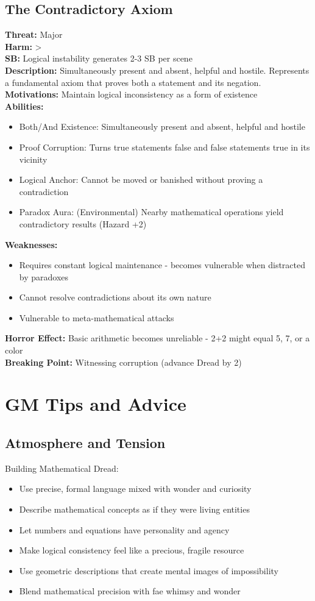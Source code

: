 \documentclass[11pt]{article}
\newenvironment{monsterentry}[1]{%
  \begin{mdframed}[backgroundcolor=shadecolor, linewidth=0pt, leftmargin=0pt, rightmargin=0pt]%
  \subsection*{#1}%
}{%
  \end{mdframed}%
}
\begin{document}
\begin{monsterentry}{The Contradictory Axiom}
\textbf{Threat:} Major \\
\textbf{Harm:} \textgreater \\
\textbf{SB:} Logical instability generates 2-3 SB per scene \\
\textbf{Description:} Simultaneously present and absent, helpful and hostile. Represents a fundamental axiom that proves both a statement and its negation. \\
\textbf{Motivations:} Maintain logical inconsistency as a form of existence \\
\textbf{Abilities:}
\begin{itemize}
\item Both/And Existence: Simultaneously present and absent, helpful and hostile
\item Proof Corruption: Turns true statements false and false statements true in its vicinity
\item Logical Anchor: Cannot be moved or banished without proving a contradiction
\item Paradox Aura: (Environmental) Nearby mathematical operations yield contradictory results (Hazard +2)
\end{itemize}
\textbf{Weaknesses:}
\begin{itemize}
\item Requires constant logical maintenance - becomes vulnerable when distracted by paradoxes
\item Cannot resolve contradictions about its own nature
\item Vulnerable to meta-mathematical attacks
\end{itemize}
\textbf{Horror Effect:} Basic arithmetic becomes unreliable - 2+2 might equal 5, 7, or a color \\
\textbf{Breaking Point:} Witnessing corruption (advance Dread by 2)
\end{monsterentry}

\section{GM Tips and Advice}

\subsection{Atmosphere and Tension}

Building Mathematical Dread:
\begin{itemize}
\item Use precise, formal language mixed with wonder and curiosity
\item Describe mathematical concepts as if they were living entities
\item Let numbers and equations have personality and agency
\item Make logical consistency feel like a precious, fragile resource
\item Use geometric descriptions that create mental images of impossibility
\item Blend mathematical precision with fae whimsy and wonder
\end{itemize}
\end{document}
